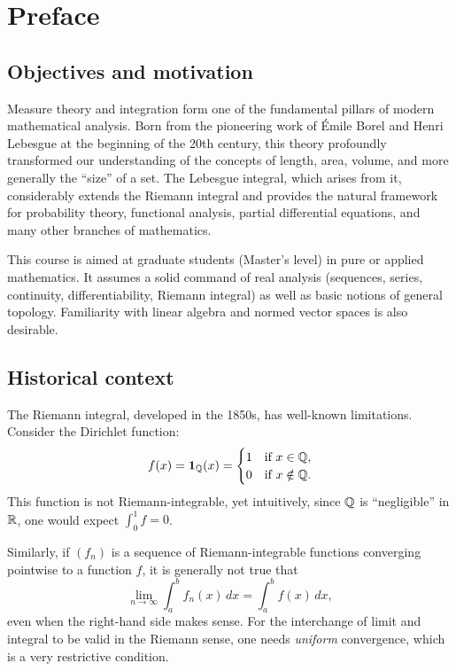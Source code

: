 \chapter*{Preface}

\section*{Objectives and motivation}

Measure theory and integration form one of the fundamental pillars of modern
mathematical analysis. Born from the pioneering work of \'Emile Borel and Henri
Lebesgue at the beginning of the 20th century, this theory profoundly transformed
our understanding of the concepts of length, area, volume, and more generally the
``size'' of a set. The Lebesgue integral, which arises from it, considerably extends
the Riemann integral and provides the natural framework for probability theory,
functional analysis, partial differential equations, and many other branches of
mathematics.

This course is aimed at graduate students (Master's level) in pure or applied
mathematics. It assumes a solid command of real analysis (sequences, series,
continuity, differentiability, Riemann integral) as well as basic notions of general
topology. Familiarity with linear algebra and normed vector spaces is also desirable.

\section*{Historical context}

The Riemann integral, developed in the 1850s, has well-known limitations. Consider
the Dirichlet function:
\[
f(x) = \mathbf{1}_{\mathbb{Q}}(x) = \begin{cases} 1 & \text{if } x \in \mathbb{Q}, \\ 0 & \text{if } x \notin \mathbb{Q}. \end{cases}
\]
This function is not Riemann-integrable, yet intuitively, since $\mathbb{Q}$ is
``negligible'' in $\mathbb{R}$, one would expect $\int_0^1 f = 0$.

Similarly, if $(f_n)$ is a sequence of Riemann-integrable functions converging
pointwise to a function $f$, it is generally not true that
\[
\lim_{n \to \infty} \int_a^b f_n(x)\, dx = \int_a^b f(x)\, dx,
\]
even when the right-hand side makes sense. For the interchange of limit and integral
to be valid in the Riemann sense, one needs \emph{uniform} convergence, which is a
very restrictive condition.

